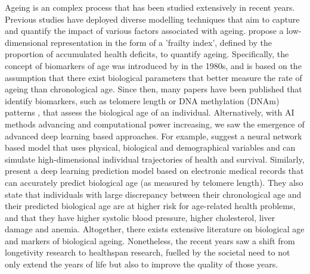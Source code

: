 Ageing is an complex process that has been studied extensively in recent years. Previous studies have deployed diverse modelling techniques that aim to capture and quantify the impact of various factors associated with ageing. \cite{mitnitski2001accumulation} propose a low-dimensional representation in the form of a 'frailty index', defined by the proportion of accumulated health deficits, to quantify ageing. Specifically, the concept of biomarkers of age was introduced by \cite{sprott2010biomarkers} in the 1980s, and is based on the assumption that there exist biological parameters that better measure the rate of ageing than chronological age. Since then, many papers have been published that identify biomarkers, such as telomere length \citep{epel2009rate} or DNA methylation (DNAm) patterns \cite{horvath2013dna}, that assess the biological age of an individual. Alternatively, with AI methods advancing and computational power increasing, we saw the emergence of advanced deep learning based approaches. For example, \cite{farrell2022interpretable} suggest a neural network based model that uses physical, biological and demographical variables and can simulate high-dimensional individual trajectories of health and survival. Similarly, \cite{wang2017predicting} present a deep learning prediction model based on electronic medical records that can accurately predict biological age (as measured by telomere length). They also state that individuals with large discrepancy between their chronological age and their predicted biological age are at higher risk for age-related health problems, and that they have higher systolic blood pressure, higher cholesterol, liver damage and anemia. Altogether, there exists extensive literature on biological age and markers of biological ageing. Nonetheless, the recent years saw a shift from longetivity research to healthspan research, fuelled by the societal need to not only extend the years of life but also to improve the quality of those years. 
\phantom{}

